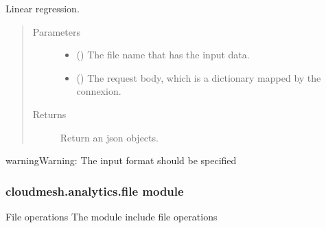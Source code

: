 \documentclass[letterpaper,10pt,english]{sphinxmanual}
\begin{document}
\begin{fulllineitems}
\label{\detokenize{cloudmesh.analytics:cloudmesh.analytics.analytics.linear_regression}}
Linear regression.
\begin{quote}\begin{description}
\item[{Parameters}] \leavevmode\begin{itemize}
\item {} 
 () \textendash{} The file name that has the input data.

\item {} 
 () \textendash{} The request body, which is a dictionary mapped by the connexion.

\end{itemize}

\item[{Returns}] \leavevmode
Return an json objects.

\end{description}\end{quote}

\begin{sphinxadmonition}{warning}{Warning:}
The input format should be specified
\end{sphinxadmonition}

\end{fulllineitems}


\begin{fulllineitems}
\label{\detokenize{cloudmesh.analytics:cloudmesh.analytics.analytics.pca}}
\end{fulllineitems}



\subsubsection{cloudmesh.analytics.file module}
\label{\detokenize{cloudmesh.analytics:module-cloudmesh.analytics.file}}\label{\detokenize{cloudmesh.analytics:cloudmesh-analytics-file-module}}
File operations
The module include file operations
\end{document}
